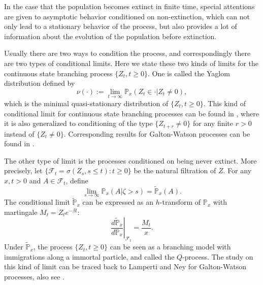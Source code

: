 \documentclass[12pt,a4paper]{amsart}
\numberwithin{equation}{section}
\theoremstyle{plain}
\theoremstyle{definition}
\theoremstyle{remark}
\begin{document}
In the case that the population becomes extinct in finite time, 
special attentions are given to 
asymptotic behavior conditioned on non-extinction, 
which can not only  lead to a stationary behavior
of the process, but also provides a lot of information about the evolution of the population before extinction.

Usually there are two ways to condition the process, and correspondingly there are two types of conditional limits. Here we state these two kinds of limits for  the continuous state branching process  $\{Z_t, t\geq 0\}$. One is called the Yaglom distribution defined by
\[
\nu(\cdot):=\lim_{t\to\infty} \mathbb P_x(Z_t\in\cdot|Z_{t}\neq 0),
\]
which is the minimal  quasi-stationary distribution of $\{Z_t, t\geq 0\}$. This kind of  conditional limit for continuous state branching processes  can be found in \cite{Li00}, where it is also generalized to conditioning of the type $\{Z_{t+r}\neq 0\}$ for any finite $r>0$ instead of $\{Z_{t}\neq 0\}$. Corresponding results for Galton-Watson processes can be found in \cite{AthreyaNey1972Branching}.

The other type of limit is the processes conditioned on being never extinct. More precisely,  let 
 $\{\mathcal F_t=\sigma(Z_s,s\leq t): t\geq 0\}$ be the natural filtration of 
 $Z$. For any $x,t>0$ and $A\in\mathcal F_t$, define
\[
\lim_{s\rightarrow\infty}\mathbb P_x(A\big|\zeta>s)=\widetilde{\mathbb P}_x(A).
\]
The conditional limit $\widetilde{\mathbb P}_x$  can be expressed as an $h$-transform of $\mathbb P_x$ with martingale $M_t=Z_te^{-\beta t}$:
\[
\left.\dfrac{d\widetilde{\mathbb P}_x}{d\mathbb P_x}\right|_{\mathcal F_t}=\dfrac{M_t}{x}.
\]
Under $\widetilde{\mathbb P}_x$, the process $\{Z_t, t\geq 0\}$  can be seen as a branching model with immigrations along a immortal particle,
and  called the  $Q$-process. The study on this kind of limit can be traced back to Lamperti and Ney \cite{LamandNey} for Galton-Watson processes, also see  \cite{AthreyaNey1972Branching}.
\end{document}
